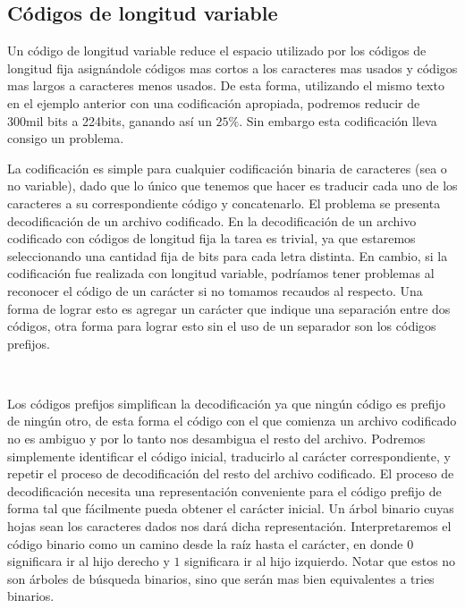 \documentclass[10pt, a4paper]{report}
\begin{document}
\subsection{C\'odigos de longitud variable}

Un c\'odigo de longitud variable reduce el espacio utilizado por los c\'odigos de longitud fija asign\'andole c\'odigos mas cortos a los caracteres mas usados y c\'odigos mas largos a caracteres menos usados. De esta forma, utilizando el mismo texto en el ejemplo anterior con una codificaci\'on apropiada, podremos reducir de 300mil bits a 224bits, ganando as\'i un $25\%$. Sin embargo esta codificaci\'on lleva consigo un problema.

La codificaci\'on es simple para cualquier codificaci\'on binaria de caracteres (sea o no variable), dado que lo \'unico que tenemos que hacer es traducir cada uno de los caracteres a su correspondiente c\'odigo y concatenarlo. El problema se presenta decodificaci\'on de un archivo codificado. En la decodificaci\'on de un archivo codificado con c\'odigos de longitud fija la tarea es trivial, ya que estaremos seleccionando una cantidad fija de bits para cada letra distinta. En cambio, si la codificaci\'on fue realizada con longitud variable, podr\'iamos tener problemas al reconocer el c\'odigo de un car\'acter si no tomamos recaudos al respecto. Una forma de lograr esto es agregar un car\'acter que indique una separaci\'on entre dos c\'odigos, otra forma para lograr esto sin el uso de un separador son los c\'odigos prefijos.

~

Los c\'odigos prefijos simplifican la decodificaci\'on ya que ning\'un c\'odigo es prefijo de ning\'un otro, de esta forma el c\'odigo con el que comienza un archivo codificado no es ambiguo y por lo tanto nos desambigua el resto del archivo. Podremos simplemente identificar el c\'odigo inicial, traducirlo al car\'acter correspondiente, y repetir el proceso de decodificaci\'on del resto del archivo codificado. El proceso de decodificaci\'on necesita una representaci\'on conveniente para el c\'odigo prefijo de forma tal que f\'acilmente pueda obtener el car\'acter inicial. Un \'arbol binario cuyas hojas sean los caracteres dados nos dar\'a dicha representaci\'on. Interpretaremos el c\'odigo binario como un camino desde la ra\'iz hasta el car\'acter, en donde $0$ significara ir al hijo derecho y $1$ significara ir al hijo izquierdo. Notar que estos no son \'arboles de b\'usqueda binarios, sino que ser\'an mas bien equivalentes a tries binarios.
\end{document}
